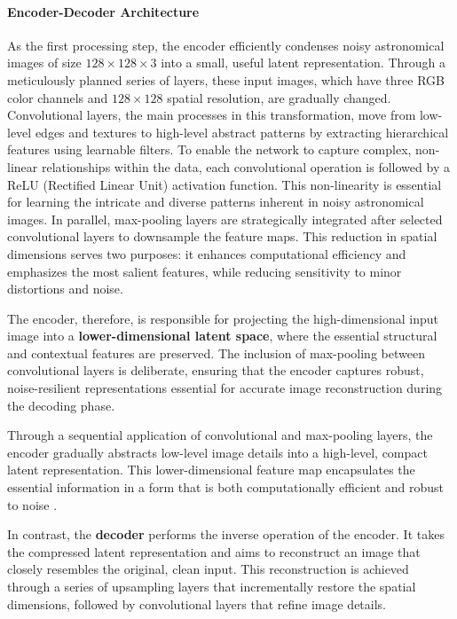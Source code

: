 \documentclass[12pt, conference]{IEEEtran}
\begin{document}
\paragraph{Encoder-Decoder Architecture}
As the first processing step, the encoder efficiently condenses noisy astronomical images of size $128 \times 128 \times 3$ into a small, useful latent representation. Through a meticulously planned series of layers, these input images, which have three RGB color channels and $128 \times 128$ spatial resolution, are gradually changed. Convolutional layers, the main processes in this transformation, move from low-level edges and textures to high-level abstract patterns by extracting hierarchical features using learnable filters.
To enable the network to capture complex, non-linear relationships within the data, each convolutional operation is followed by a ReLU (Rectified Linear Unit) activation function. This non-linearity is essential for learning the intricate and diverse patterns inherent in noisy astronomical images. In parallel, max-pooling layers are strategically integrated after selected convolutional layers to downsample the feature maps. This reduction in spatial dimensions serves two purposes: it enhances computational efficiency and emphasizes the most salient features, while reducing sensitivity to minor distortions and noise.

The encoder, therefore, is responsible for projecting the high-dimensional input image into a \textbf{lower-dimensional latent space}, where the essential structural and contextual features are preserved. The inclusion of max-pooling between convolutional layers is deliberate, ensuring that the encoder captures robust, noise-resilient representations essential for accurate image reconstruction during the decoding phase.

Through a sequential application of convolutional and max-pooling layers, the encoder gradually abstracts low-level image details into a high-level, compact latent representation. This lower-dimensional feature map encapsulates the essential information in a form that is both computationally efficient and robust to noise \cite{hinton2006reducing}.

In contrast, the \textbf{decoder} performs the inverse operation of the encoder. It takes the compressed latent representation and aims to reconstruct an image that closely resembles the original, clean input. This reconstruction is achieved through a series of upsampling layers that incrementally restore the spatial dimensions, followed by convolutional layers that refine image details.
\end{document}
